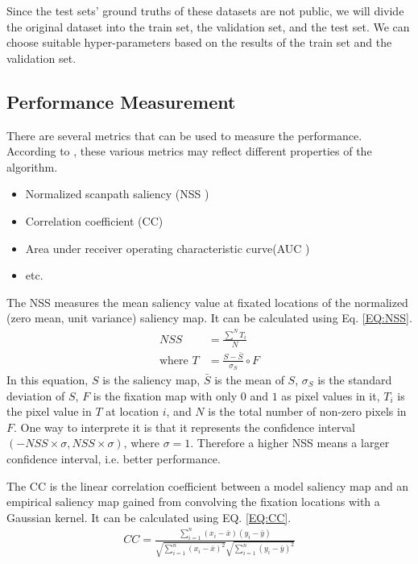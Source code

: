\documentclass[12pt]{article}
\begin{document}
Since the test sets' ground truths of these datasets are not public, we will divide the original dataset into the train set, the validation set, and the test set. We can choose suitable hyper-parameters based on the results of the train set and the validation set.

\subsection{Performance Measurement}

There are several metrics that can be used to measure the performance. According to \cite{riche2013saliency}, these various metrics may reflect different properties of the algorithm.
\begin{itemize}
    \item Normalized scanpath saliency (NSS \cite{petersComponentsBottomupGaze2005})
    \item Correlation coefficient (CC)
    \item Area under receiver operating characteristic curve(AUC \cite{richeSaliencyHumanFixations2013})
    \item etc.
\end{itemize}

The NSS measures the mean saliency value at fixated locations of the normalized (zero mean, unit variance) saliency map. 
It can be calculated using Eq. \ref{EQ:NSS}. 
\begin{equation}
    \begin{aligned}
        NSS &= \frac{\sum^{N} T_{i}}{N}\\
        \text{where }T &= \frac{S - \bar{S}}{\sigma_{S}} \circ F
    \end{aligned}
    \label{EQ:NSS}
\end{equation}
In this equation, $S$ is the saliency map, $\bar{S}$ is the mean of $S$, $\sigma_{S}$ is 
the standard deviation of $S$, $F$ is the fixation map with only $0$ and $1$ as pixel values in it,
$T_{i}$ is the pixel value in $T$ at location $i$, and $N$ is the total number of non-zero pixels in $F$.
One way to interprete it is that it represents the confidence interval $(-NSS\times\sigma, NSS\times\sigma)$, where
$\sigma = 1$. Therefore a higher NSS means a larger confidence interval, i.e. better performance.

The CC is the linear correlation coefficient between a model saliency map and an empirical saliency map gained from convolving the fixation locations with a Gaussian kernel.
It can be calculated using EQ. \ref{EQ:CC}.
\begin{equation}
    \begin{aligned}
        CC = \frac{\sum_{i=1}^{n}(x_{i}-\bar{x})(y_{i}-\bar{y})}
        {\sqrt{\sum_{i=1}^{n}(x_{i}-\bar{x})^{2}}\sqrt{\sum_{i=1}^{n}(y_{i}-\bar{y})^{2}}}
    \end{aligned}
    \label{EQ:CC}
\end{equation}
\end{document}
